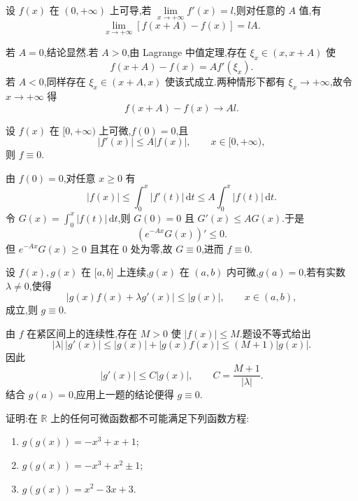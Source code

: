 \begin{example}
    设 $f(x)$ 在 $(0,+\infty)$ 上可导,若 $\displaystyle\lim\limits_{x\to+\infty}f'(x)=l$,则对任意的 $A$ 值,有
    \[
        \displaystyle\lim\limits_{x\to+\infty}[f(x+A)-f(x)]=lA.
    \]
\end{example}
\exampleblank

\begin{solution}
    若 $A=0$,结论显然.若 $A>0$,由 Lagrange 中值定理,存在 $\xi_x\in(x,x+A)$ 使
    \[
        f(x+A)-f(x)=Af'(\xi_x).
    \]
    若 $A<0$,同样存在 $\xi_x\in(x+A,x)$ 使该式成立.两种情形下都有 $\xi_x\to+\infty$,故令 $x\to+\infty$ 得
    \[
        f(x+A)-f(x)\longrightarrow Al.
    \]
\end{solution}

\begin{example}[\markstar]
    设 $f(x)$ 在 $\lbrack 0,+\infty)$ 上可微,$f(0)=0$,且
    \[
        |f'(x)|\leq A|f(x)|,
        \qquad x\in\lbrack 0,+\infty),
    \]
    则 $f\equiv0$.
\end{example}
\exampleblank

\begin{solution}
    由 $f(0)=0$,对任意 $x\geq0$ 有
    \[
        |f(x)|\leq\int_0^x|f'(t)|\,\mathrm{d}t
        \leq A\int_0^x|f(t)|\,\mathrm{d}t.
    \]
    令 $G(x)=\displaystyle\int_0^x|f(t)|\,\mathrm{d}t$,则 $G(0)=0$ 且 $G'(x)\leq AG(x)$.于是
    \[
        \left(e^{-Ax}G(x)\right)'\leq0.
    \]
    但 $e^{-Ax}G(x)\geq0$ 且其在 $0$ 处为零,故 $G\equiv0$,进而 $f\equiv0$.
\end{solution}

\begin{example}
    设 $f(x),g(x)$ 在 $\lbrack a,b\rbrack$ 上连续,$g(x)$ 在 $(a,b)$ 内可微,$g(a)=0$,若有实数 $\lambda\neq0$,使得
    \[
        |g(x)f(x)+\lambda g'(x)|\leq|g(x)|,
        \qquad x\in(a,b),
    \]
    成立,则 $g\equiv0$.
\end{example}
\exampleblank

\begin{solution}
    由 $f$ 在紧区间上的连续性,存在 $M>0$ 使 $|f(x)|\leq M$.题设不等式给出
    \[
        |\lambda|\,|g'(x)|
        \leq |g(x)|+|g(x)f(x)|
        \leq(M+1)|g(x)|.
    \]
    因此
    \[
        |g'(x)|\leq C|g(x)|,
        \qquad C=\dfrac{M+1}{|\lambda|}.
    \]
    结合 $g(a)=0$,应用上一题的结论便得 $g\equiv0$.
\end{solution}

\begin{example}
    证明:在 $\mathbb{R}$ 上的任何可微函数都不可能满足下列函数方程:
    \begin{enumerate}
        \item $g(g(x))=-x^3+x+1$;
        \item $g(g(x))=-x^3+x^2\pm1$;
        \item $g(g(x))=x^2-3x+3$.
    \end{enumerate}
\end{example}
\exampleblank

